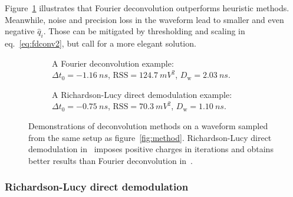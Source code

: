 Figure~\ref{fig:fd} illustrates that Fourier deconvolution outperforms heuristic methods.  Meanwhile, noise and precision loss in the waveform lead to smaller and even negative $\hat{q}_i$. Those can be mitigated by thresholding and scaling in eq.~\eqref{eq:fdconv2}, but call for a more elegant solution.

\begin{figure}[H]
  \begin{subfigure}{0.5\textwidth}
    \centering
    \resizebox{\textwidth}{!}{}
    \caption{\label{fig:fd} A Fourier deconvolution example: \\ $\Delta t_0=\SI{-1.16}{ns}$, $\mathrm{RSS}=\SI{124.7}{mV^2}$, $D_\mathrm{w}=\SI{2.03}{ns}$.}
  \end{subfigure}
  \begin{subfigure}{0.5\textwidth}
    \centering
    \resizebox{\textwidth}{!}{}
    \caption{\label{fig:lucy} A Richardson-Lucy direct demodulation example:\\ $\Delta t_0=\SI{-0.75}{ns}$, $\mathrm{RSS}=\SI{70.3}{mV^2}$, $D_\mathrm{w}=\SI{1.10}{ns}$.}
  \end{subfigure}
  \caption{\label{fig:deconv}Demonstrations of deconvolution methods on a waveform sampled from the same setup as figure~\ref{fig:method}. Richardson-Lucy direct demodulation in~ imposes positive charges in iterations and obtains better results than Fourier deconvolution in~.}
\end{figure}

\subsubsection{Richardson-Lucy direct demodulation}
\label{sec:lucyddm}

